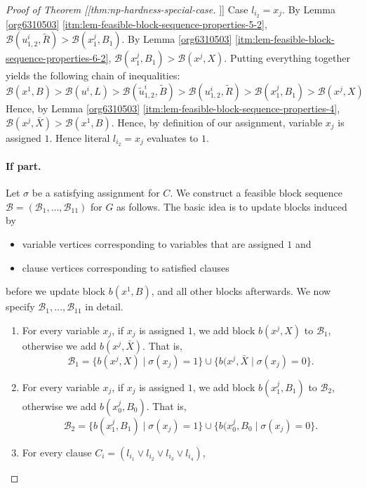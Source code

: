 \documentclass[fontsize=11pt,paper=a4]{book}
\begin{document}
\begin{proof}[Proof of Theorem [[thm:np-hardness-special-case]]]
Case \(l_{i_2}=x_j\).
By Lemma \ref{org6310503} \ref{itm:lem-feasible-block-sequence-properties-5-2}, \(\mathcal{B}(u_{1,2}^i,\tilde{R})>\mathcal{B}(x_1^j,B_1)\).
By Lemma \ref{org6310503} \ref{itm:lem-feasible-block-sequence-properties-6-2}, \(\mathcal{B}(x_1^j,B_1)>\mathcal{B}(x^j,X)\).
Putting everything together yields the following chain of inequalities:
\[
\mathcal{B}(x^1,B)>
\mathcal{B}(u^i,L)>
\mathcal{B}(\tilde{u}_{1,2}^i,\tilde{B})>
\mathcal{B}(u_{1,2}^i,\tilde{R})>
\mathcal{B}(x_1^j,B_1)>
\mathcal{B}(x^j,X)
\]
Hence, by Lemma \ref{org6310503} \ref{itm:lem-feasible-block-sequence-properties-4}, \(\mathcal{B}(x^j,\bar{X})>\mathcal{B}(x^1,B)\).
Hence, by definition of our assignment, variable \(x_j\) is assigned \(1\).
Hence literal \(l_{i_2}=x_j\) evaluates to \(1\).

\paragraph{If part.}
Let \(\sigma\) be a satisfying assignment for \(C\).
We construct a feasible block sequence \(\mathcal{B}=(\mathscr{B}_1,\dots,\mathscr{B}_{11})\) for \(G\) as follows.
The basic idea is to update blocks induced by

\begin{itemize}
\item variable vertices corresponding to variables that are assigned \(1\) and

\item clause vertices corresponding to satisfied clauses
\end{itemize}


before we update block \(b(x^1,B)\), and all other blocks afterwards.
We now specify \(\mathscr{B}_1,\dots,\mathscr{B}_{11}\) in detail.

\begin{enumerate}
\item For every variable \(x_j\), if \(x_j\) is assigned \(1\), we add block \(b(x^j,X)\) to \(\mathscr{B}_1\), otherwise we add \(b(x^j,\bar{X})\).
That is,
\[
   \mathscr{B}_1=\{b(x^j,X)\mid\sigma(x_j)=1\}\cup\{b(x^j,\bar{X}\mid\sigma(x_j)=0\}.
   \]

\item For every variable \(x_j\), if \(x_j\) is assigned \(1\), we add block \(b(x_1^j,B_1)\) to \(\mathscr{B}_2\), otherwise we add \(b(x_0^j,B_0)\).
That is,
\[
   \mathscr{B}_2=\{b(x_1^j,B_1)\mid\sigma(x_j)=1\}\cup\{b(x_0^j,B_0\mid\sigma(x_j)=0\}.
   \]

\item For every clause \(C_i=(l_{i_1}\vee l_{i_2}\vee l_{i_3}\vee l_{i_4})\),


\end{enumerate}
\end{proof}
\end{document}
